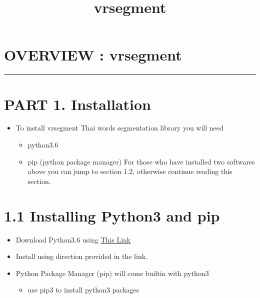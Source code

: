 \documentclass[11pt]{article}
\title{vrsegment}
\providecommand{\tightlist}{%
      \setlength{\itemsep}{0pt}\setlength{\parskip}{0pt}}
\begin{document}
    
    
    \maketitle
    
    

    
    \section{OVERVIEW : vrsegment}\label{overview-vrsegment}

\begin{center}\rule{0.5\linewidth}{\linethickness}\end{center}

    \section{PART 1. Installation}\label{part-1.-installation}

\begin{itemize}
\tightlist
\item
  To install vrsegment Thai words segmentation library you will need

  \begin{itemize}
  \tightlist
  \item
    python3.6
  \item
    pip (python package manager) For those who have installed two
    softwares above you can jump to section 1.2, otherwise continue
    reading this section.
  \end{itemize}
\end{itemize}

\section{1.1 Installing Python3 and
pip}\label{installing-python3-and-pip}

\begin{itemize}
\item
  Download Python3.6 using \href{http://www.python.org/downloads/}{This
  Link}
\item
  Install using direction provided in the link.
\item
  Python Package Manager (pip) will come builtin with python3

  \begin{itemize}
  \tightlist
  \item
    use pip3 to install python3 packages
  \end{itemize}
\end{itemize}
\end{document}
